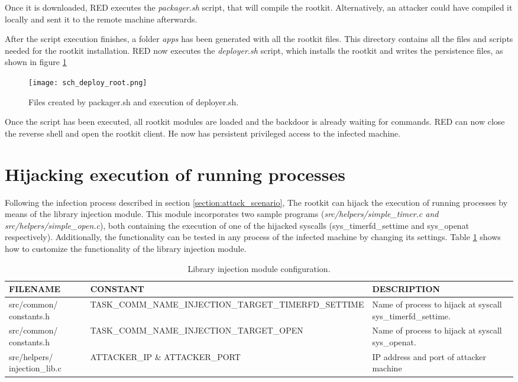 Once it is downloaded, RED executes the \textit{packager.sh} script, that will compile the rootkit. Alternatively, an attacker could have compiled it locally and sent it to the remote machine afterwards.

After the script execution finishes, a folder \textit{apps} has been generated with all the rootkit files. This directory contains all the files and scripts needed for the rootkit installation. RED now executes the \textit{deployer.sh} script, which installs the rootkit and writes the persistence files, as shown in figure \ref{fig:deploy_root}

\begin{figure}[htbp]
	\centering
	\texttt{[image: sch\_deploy\_root.png]}
	\caption{Files created by packager.sh and execution of deployer.sh.}
	\label{fig:deploy_root}
\end{figure}

Once the script has been executed, all rootkit modules are loaded and the backdoor is already waiting for commands. RED can now close the reverse shell and open the rootkit client. He now has persistent privileged access to the infected machine.

\section{Hijacking execution of running processes}
Following the infection process described in section \ref{section:attack_scenario}, The rootkit can hijack the execution of running processes by means of the library injection module. This module incorporates two sample programs (\textit{src/helpers/simple\_timer.c and src/helpers/simple\_open.c}), both containing the execution of one of the hijacked syscalls (sys\_timerfd\_settime and sys\_openat respectively). Additionally, the functionality can be tested in any process of the infected machine by changing its settings. Table \ref{table:lib_injection_config} shows how to customize the functionality of the library injection module.

\begin{table}[htbp]
\begin{tabular}{|>{\centering\arraybackslash}p{3cm}|>{\centering\arraybackslash}p{5.5cm}|>{\centering\arraybackslash}p{5.5cm}|}
\hline
\textbf{FILENAME} & \textbf{CONSTANT} & \textbf{DESCRIPTION}\\
\hline
\hline
src/common/ constants.h & TASK\_COMM\_NAME\_INJECTION\_TARGET\_TIMERFD\_SETTIME & Name of process to hijack at syscall sys\_timerfd\_settime.\\
\hline
src/common/ constants.h & TASK\_COMM\_NAME\_INJECTION\_TARGET\_OPEN & Name of process to hijack at syscall sys\_openat.\\
\hline
src/helpers/ injection\_lib.c & ATTACKER\_IP \& ATTACKER\_PORT & IP address and port of attacker machine\\
\hline
\end{tabular}
\caption{Library injection module configuration.}
\label{table:lib_injection_config}
\end{table}

